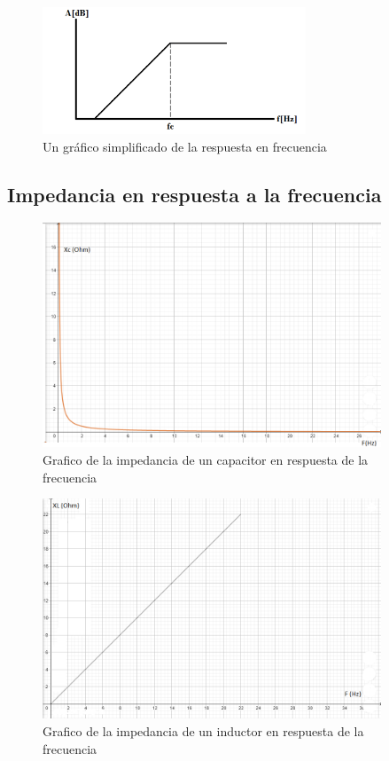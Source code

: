 \documentclass[../main.tex]{subfiles}
\begin{document}
		\begin{figure}[H]
			\centering
			\includegraphics[width=0.7\textwidth]{filtros/pasa-alto_grafico.png}
			\caption{Un gráfico simplificado de la respuesta en frecuencia}
		\end{figure}

	\subsection{Impedancia en respuesta a la frecuencia}
	\begin{figure}[H]
		\centering
		\includegraphics[width= 0.9\textwidth]{filtros/impedancia_capacitiva.png}
		\caption{Grafico de la impedancia de un capacitor en respuesta de la frecuencia}
	\end{figure}\begin{figure}[H]
		\centering
		\includegraphics[width=0.9\textwidth]{filtros/impedancia_inductiva.png}
		\caption{Grafico de la impedancia de un inductor en respuesta de la frecuencia}
	\end{figure}
\end{document}
